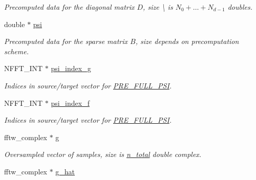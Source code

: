 \begin{DoxyCompactItemize}
\begin{DoxyCompactList}\small\item\em Precomputed data for the diagonal matrix $D$, size \textbackslash{} is $N_0+\dots+N_{d-1}$ doubles. \end{DoxyCompactList}\item 
\hypertarget{structnfft__plan_a0330a1c3ae461fa9156ba0ecbe17bb7c}{double $\ast$ \hyperlink{structnfft__plan_a0330a1c3ae461fa9156ba0ecbe17bb7c}{psi}}\label{structnfft__plan_a0330a1c3ae461fa9156ba0ecbe17bb7c}

\begin{DoxyCompactList}\small\item\em Precomputed data for the sparse matrix $B$, size depends on precomputation scheme. \end{DoxyCompactList}\item 
\hypertarget{structnfft__plan_a7ae1d7e1f29fb968f154d1057e61b2dc}{N\-F\-F\-T\-\_\-\-I\-N\-T $\ast$ \hyperlink{structnfft__plan_a7ae1d7e1f29fb968f154d1057e61b2dc}{psi\-\_\-index\-\_\-g}}\label{structnfft__plan_a7ae1d7e1f29fb968f154d1057e61b2dc}

\begin{DoxyCompactList}\small\item\em Indices in source/target vector for \hyperlink{group__nfft_ga7ad8a7e19519b16340dabec48899c6a4}{P\-R\-E\-\_\-\-F\-U\-L\-L\-\_\-\-P\-S\-I}. \end{DoxyCompactList}\item 
\hypertarget{structnfft__plan_a85ed76c697ce772710a113bbcf5a1f65}{N\-F\-F\-T\-\_\-\-I\-N\-T $\ast$ \hyperlink{structnfft__plan_a85ed76c697ce772710a113bbcf5a1f65}{psi\-\_\-index\-\_\-f}}\label{structnfft__plan_a85ed76c697ce772710a113bbcf5a1f65}

\begin{DoxyCompactList}\small\item\em Indices in source/target vector for \hyperlink{group__nfft_ga7ad8a7e19519b16340dabec48899c6a4}{P\-R\-E\-\_\-\-F\-U\-L\-L\-\_\-\-P\-S\-I}. \end{DoxyCompactList}\item 
\hypertarget{structnfft__plan_a844b51e453d6c80462eaad7844633539}{fftw\-\_\-complex $\ast$ \hyperlink{structnfft__plan_a844b51e453d6c80462eaad7844633539}{g}}\label{structnfft__plan_a844b51e453d6c80462eaad7844633539}

\begin{DoxyCompactList}\small\item\em Oversampled vector of samples, size is \hyperlink{structnfft__plan_a9ffe9fb93c209bfc0d6a1386cb450379}{n\-\_\-total} double complex. \end{DoxyCompactList}\item 
\hypertarget{structnfft__plan_a2dff6c2b829694a7d4cca5acc7c7d6d5}{fftw\-\_\-complex $\ast$ \hyperlink{structnfft__plan_a2dff6c2b829694a7d4cca5acc7c7d6d5}{g\-\_\-hat}}\label{structnfft__plan_a2dff6c2b829694a7d4cca5acc7c7d6d5}


\end{DoxyCompactItemize}
